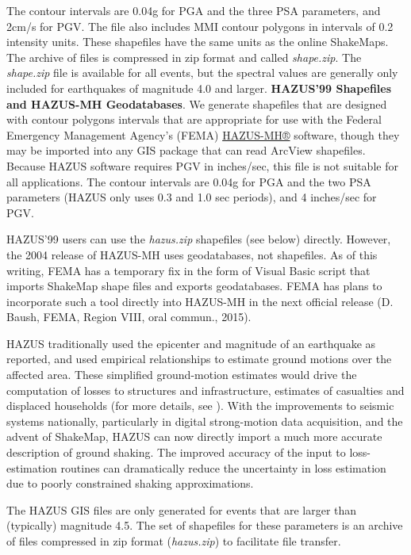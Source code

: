 \documentclass[letterpaper,10pt,english]{sphinxmanual}
\begin{document}
The contour intervals are 0.04g for PGA and the three
PSA parameters, and 2cm/s for PGV. The file also includes MMI
contour polygons in intervals of 0.2 intensity units.  These shapefiles have
the same units as the online ShakeMaps. The archive of files is
compressed in zip format and called \emph{shape.zip}.  The \emph{shape.zip} file is
available for all events, but the spectral values are generally only included
for earthquakes of magnitude 4.0 and larger.
\label{products:hazus}
\textbf{HAZUS’99 Shapefiles and HAZUS-MH Geodatabases}. We generate shapefiles that
are designed with contour polygons intervals that are appropriate for use with
the Federal Emergency Management Agency’s (FEMA) \href{http://www.fema.gov/hazus/}{HAZUS-MH®} software, though they may be imported into any
GIS package that can read ArcView shapefiles. Because HAZUS software requires
PGV in inches/sec, this file is not suitable for all
applications. The contour intervals are 0.04g for PGA and the two PSA
parameters (HAZUS only uses 0.3 and 1.0 sec periods), and 4
inches/sec for PGV.

HAZUS’99 users can use the \emph{hazus.zip} shapefiles (see below) directly.  However,
the 2004 release of HAZUS-MH uses geodatabases, not shapefiles.  As of this
writing, FEMA has a temporary fix in the form of Visual Basic script that
imports ShakeMap shape files and exports geodatabases.  FEMA has plans to
incorporate such a tool directly into HAZUS-MH in the next official release (D.
Baush, FEMA, Region VIII, oral commun., 2015).

HAZUS traditionally used the epicenter and magnitude of an earthquake as
reported, and used empirical relationships to estimate ground motions over the
affected area.  These simplified ground-motion estimates would drive the computation of
losses to structures and infrastructure, estimates of casualties and displaced
households (for more details, see {\hyperref[references:nibs1997]{}}).  With the
improvements to seismic systems nationally, particularly in digital
strong-motion data acquisition, and the advent of ShakeMap, HAZUS can now
directly import a much more accurate description of ground shaking.  The
improved accuracy of the input to loss-estimation routines can dramatically
reduce the uncertainty in loss estimation due to poorly constrained shaking
approximations.

The HAZUS GIS files are only generated for events that are larger than
(typically) magnitude 4.5.  The set of shapefiles for these parameters is an
archive of files compressed in
zip format (\emph{hazus.zip}) to facilitate file transfer.
\end{document}
